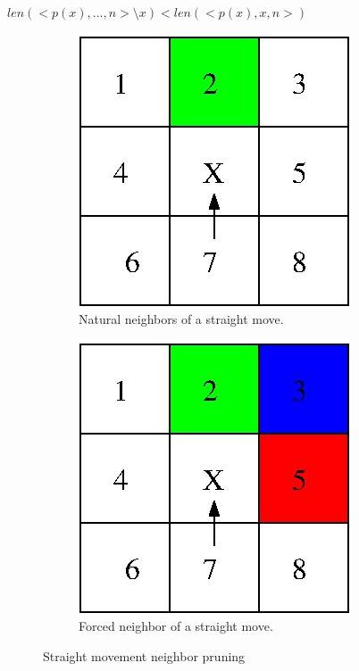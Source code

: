\documentclass[12pt]{article}
\begin{document}
$len( <p(x),...,n> \setminus x ) < len( <p(x),x,n> )$


\begin{figure}
  \begin{subfigure}[b]{.5\linewidth}
    \caption{Natural neighbors of a straight move.}\label{sm:1}
    \includegraphics[scale=1]{figures/straight_movement_1.eps}
  \end{subfigure}
  \begin{subfigure}[b]{.5\linewidth}
    \caption{Forced neighbor of a straight move.}\label{sm:2}
    \includegraphics[scale=1]{figures/straight_movement_2.eps}
  \end{subfigure}
  \caption{Straight movement neighbor pruning}\label{sm}
\end{figure}
\end{document}
